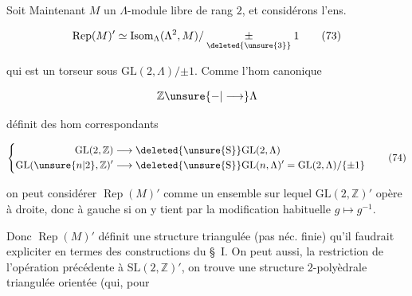 
 Soit Maintenant $M$ un $\Lambda$-module libre de rang $2$, et considérons l'ens.

\[
\operatorname{Rep}(M)'\simeq\operatorname{Isom}_\Lambda(\Lambda^2,M)/\underset{\deleted{\unsure{3}}}{\pm}1\tag*{(73)}
\]

qui est un torseur  sous $\mathrm{GL}(2,\Lambda)/{\pm1}$. Comme l'hom canonique

\[
\mathbb{Z}\unsure{\mathbin{-}|\longrightarrow}\Lambda
\]

définit des hom correspondants

\[
\left\{\begin{aligned}
\mathrm{GL}(2,\mathbb{Z})&\longrightarrow\deleted{\unsure{\mathrm S}}\mathrm{GL}(2,\Lambda)\\
\mathrm{GL}(\unsure{n|2},\mathbb{Z})'&\longrightarrow\deleted{\unsure{\mathrm S}}\mathrm{GL}(n,\Lambda)'=\mathrm{GL}(2,\Lambda)/\{\pm1\}
\end{aligned}\right.\tag*{(74)}
\]

on peut considérer $\operatorname{Rep}(M)'$ comme un ensemble sur lequel $\mathrm{GL}(2,\mathbb{Z})'$ opère à droite, donc à gauche si on y tient par la modification habituelle $g\longmapsto g^{-1}$.

Donc $\operatorname{Rep}(M)'$ définit une structure  triangulée (pas néc. finie) qu'il faudrait expliciter en termes des constructions du \S\ I. On peut aussi,   la restriction de l'opération précédente à $\mathrm{SL}(2,\mathbb{Z})'$, on trouve une structure $2$-polyèdrale triangulée orientée (qui, pour


